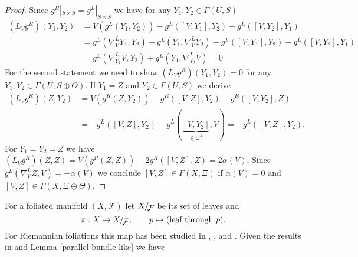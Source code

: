 \documentclass[a4paper,10pt,twoside]{amsart}
\theoremstyle{definition}
\theoremstyle{remark}
\numberwithin{equation}{section}
\begin{document}
\begin{proof}
	Since $g^{R}|_{S \times S} = g^{L}|_{S \times S}$ we have for any $Y_{1},Y_{2} \in \Gamma(U,S)$
	\begin{align*}
		(L_{V}g^{R})(Y_{1},Y_{2}) &= V(g^{L}(Y_{1},Y_{2})) -g^{L}([V,Y_{1}],Y_{2}) -g^{L}([V,Y_{2}],Y_{1})\\
					&= g^{L}(\nabla^{L}_{V}{Y_{1}},Y_{2}) + g^{L}(Y_{1},\nabla^{L}_{V}{Y_{2}})
							-g^{L}([V,Y_{1}],Y_{2}) -g^{L}([V,Y_{2}],Y_{1})\\
					&= g^{L}(\nabla^{L}_{Y_{1}}{V},Y_{2}) + g^{L}(Y_{1},\nabla^{L}_{Y_{2}}{V}) = 0
	\end{align*}
	For the second statement we need to show $(L_{V}g^{R})(Y_{1},Y_{2})=0$ for any $Y_{1},Y_{2} \in \Gamma(U,S \oplus \Theta)$. If $Y_{1}=Z$ and
	$Y_{2} \in \Gamma(U,S)$ we derive
	\begin{align*}
		(L_{V}g^{R})(Z,Y_{2}) &= V(g^{R}(Z,Y_{2})) -g^{R}([V,Z],Y_{2}) -g^{R}([V,Y_{2}],Z)\\
					&= -g^{L}([V,Z],Y_{2}) -g^{L}(\underbrace{[V,Y_{2}]}_{\in \Xi^{\perp}},V) = -g^{L}([V,Z],Y_{2}).
	\end{align*}
	For $Y_{1}=Y_{2}=Z$ we have $(L_{V}g^{R})(Z,Z) = V(g^{R}(Z,Z)) -2g^{R}([V,Z],Z) = 2\alpha(V)$. Since $g^{L}(\nabla^{L}_{V}Z,V) = -\alpha(V)$ we
	conclude $[V,Z] \in \Gamma(X,\Xi)$ if $\alpha(V)=0$ and $[V,Z] \in \Gamma(X,\Xi \oplus \Theta)$.
\end{proof}
For a foliated manifold $(X,\mathcal{F})$ let ${{{X}}/\!\raisebox{-.575ex}{\ensuremath{{\mathcal{F}}}}}$ be its set of leaves and
\begin{equation*}
	\pi: X \rightarrow {{{X}}/\!\raisebox{-.575ex}{\ensuremath{{\mathcal{F}}}}}, \qquad p \mapsto (\text{leaf through}~p).
\end{equation*}
For Riemannian foliations this map has been studied in \cite{MR0142130}, \cite{MR0120592}, \cite{MR637184} and
\cite{MR932463}. Given the results in \cite{MR0370617} and Lemma \ref{parallel-bundle-like} we have
\end{document}
